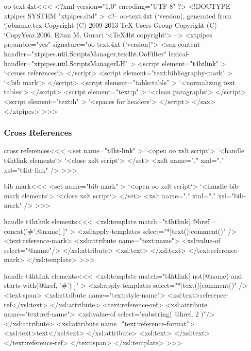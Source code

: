 \documentclass{article}
\begin{document}





\<oo-text.4xt\><<<
<?xml version="1.0" encoding="UTF-8" ?>
<!DOCTYPE xtpipes SYSTEM "xtpipes.dtd" >
<!-- oo-text.4xt (`version), generated from `jobname.tex
     Copyright (C) 2009-2013 TeX Users Group
     Copyright (C) `CopyYear.2006. Eitan M. Gurari
`<TeX4ht copyright`> -->
<xtpipes preamble="yes" signature="oo-text.4xt (`version)">
   <sax content-handler="xtpipes.util.ScriptsManager,tex4ht.OoFilter" 
        lexical-handler="xtpipes.util.ScriptsManagerLH" >
      <script element="t4htlink" >
         `<cross references`>
      </script> 
      <script element="text:bibliography-mark" >
         `<bib mark`>
      </script> 
      <script element="table:table" >
         `<normalizing text tables`>
      </script> 
      <script element="text:p" >
         `<clean paragraphs`>
      </script> 
      <script element="text:h" >
         `<spaces for headers`>
      </script> 
   </sax>
</xtpipes>
>>>


\subsubsection{Cross References}



\<cross references\><<<
<set name="t4ht-link" >
   `<open oo xslt script`>
    `<handle t4htlink elements`>
   `<close xslt script`>
</set>
<xslt name="." xml="." xsl="t4ht-link" />
>>>

\<bib mark\><<<
<set name="bib-mark" >
   `<open oo xslt script`>
    `<handle bib mark elements`>
   `<close xslt script`>
</set>
<xslt name="." xml="." xsl="bib-mark" />
>>>



\<handle t4htlink elements\><<<
<xsl:template match="t4htlink[ @href = concat('#',@name) ]" >
  <xsl:apply-templates select="*|text()|comment()" />
  <text:reference-mark>
     <xsl:attribute name="text:name">
        <xsl:value-of select="@name"/>
     </xsl:attribute>
     <xsl:text> </xsl:text>
  </text:reference-mark>
</xsl:template> 
>>>

\<handle t4htlink elements\><<<
<xsl:template match="t4htlink[ not(@name) 
                           and
                               starts-with(@href, '#') 
]" >
  <xsl:apply-templates select="*|text()|comment()" />
   <text:span>
        <xsl:attribute name="text:style-name">
           <xsl:text>reference-ref</xsl:text>
        </xsl:attribute>
     <text:reference-ref>
        <xsl:attribute name="text:ref-name">
           <xsl:value-of select="substring( @href, 2 )"/>
        </xsl:attribute>
        <xsl:attribute name="text:reference-format">
           <xsl:text>text</xsl:text>
        </xsl:attribute>
        <xsl:text> </xsl:text>   
     </text:reference-ref>
   </text:span>
</xsl:template> 
>>>
\end{document}

